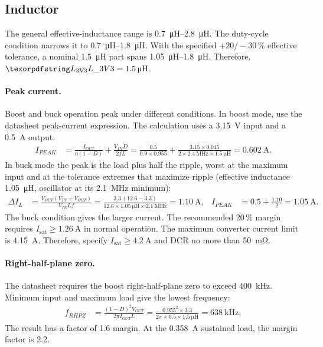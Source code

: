 \subsection{Inductor}\label{sec:3v3-inductor}

The general effective-inductance range is
\SIrange{0.7}{2.8}{\micro\henry}. The duty-cycle condition narrows it to
\SIrange{0.7}{1.8}{\micro\henry}. With the specified $+20/-30\,\%$ effective
tolerance, a nominal \SI{1.5}{\micro\henry} part spans
\SIrange{1.05}{1.8}{\micro\henry}. Therefore,
$\des{L}{3V3} = \SI{1.5}{\micro\henry}$.

\paragraph{Peak current.} Boost and buck operation peak under different
conditions. In boost mode, use the datasheet peak-current expression. The
calculation uses a \SI{3.15}{\volt} input and a \SI{0.5}{\ampere} output:
\begin{align*}
  I_{PEAK} &= \frac{I_{OUT}}{\eta(1-D)} + \frac{V_{IN} D}{2 f L}
    = \frac{0.5}{0.9\times0.955} + \frac{3.15\times0.045}
      {2\times\SI{2.4}{\mega\hertz}\times\SI{1.5}{\micro\henry}}
    = \SI{0.602}{\ampere}.
\end{align*}
In buck mode the peak is the load plus half the ripple, worst at the maximum
input and at the tolerance extremes that maximize ripple (effective inductance
\SI{1.05}{\micro\henry}, oscillator at its \SI{2.1}{\mega\hertz} minimum):
\begin{align*}
  \Delta I_L &= \frac{V_{OUT}(V_{IN}-V_{OUT})}{V_{IN} L f}
    = \frac{3.3\,(12.6-3.3)}{12.6\times\SI{1.05}{\micro\henry}\times\SI{2.1}{\mega\hertz}}
    = \SI{1.10}{\ampere},
  &
  I_{PEAK} &= 0.5 + \frac{1.10}{2} = \SI{1.05}{\ampere}.
\end{align*}
The buck condition gives the larger current. The recommended $20\,\%$ margin
requires $I_{\mathrm{sat}} \geq \SI{1.26}{\ampere}$ in normal operation. The
maximum converter current limit is \SI{4.15}{\ampere}. Therefore, specify
$I_{\mathrm{sat}} \geq \SI{4.2}{\ampere}$ and DCR no more than
\SI{50}{\milli\ohm}.

\paragraph{Right-half-plane zero.} The datasheet requires the boost
right-half-plane zero to exceed \SI{400}{\kilo\hertz}. Minimum input and maximum
load give the lowest frequency:
\begin{align*}
  f_{RHPZ} &= \frac{(1-D)^2 V_{OUT}}{2\pi I_{OUT} L}
    = \frac{0.955^2 \times 3.3}
      {2\pi \times 0.5 \times \SI{1.5}{\micro\henry}} = \SI{638}{\kilo\hertz},
\end{align*}
The result has a factor of 1.6 margin. At the
\SI{0.358}{\ampere} sustained load, the margin factor is 2.2.

